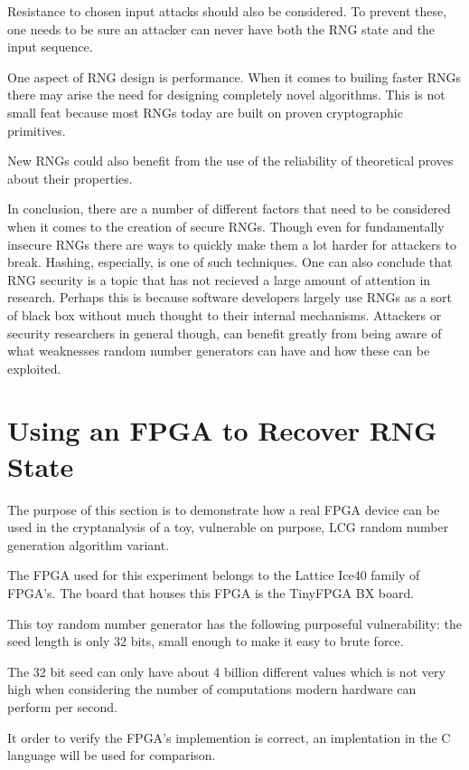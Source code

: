 \documentclass{article}
\begin{document}
    Resistance to chosen input attacks should also be considered. To prevent these,
    one needs to be sure an attacker can never have both the RNG state and the
    input sequence.

    One aspect of RNG design is performance. When it comes to builing faster RNGs
    there may arise the need for designing completely novel algorithms.
    This is not small feat because most RNGs today are built on proven cryptographic
    primitives.

    New RNGs could also benefit from the use of the reliability of theoretical proves
    about their properties.

    In conclusion, there are a number of different factors that need to be considered
    when it comes to the creation of secure RNGs. Though even for fundamentally insecure
    RNGs there are ways to quickly make them a lot harder for attackers to break.
    Hashing, especially, is one of such techniques.
    One can also conclude that RNG security is a topic that has not recieved a large
    amount of attention in research. Perhaps this is because software developers
    largely use RNGs as a sort of black box without much thought to their internal
    mechanisms.
    Attackers or security researchers in general though, can benefit greatly from
    being aware of what weaknesses random number generators can have and
    how these can be exploited.

    \section{Using an FPGA to Recover RNG State}

    The purpose of this section is to demonstrate how a real FPGA device
    can be used in the cryptanalysis of a toy, vulnerable on purpose,
    LCG random number generation algorithm variant.

    The FPGA used for this experiment belongs to the Lattice Ice40 family of FPGA's.
    The board that houses this FPGA is the TinyFPGA BX board.

    This toy random number generator has the following purposeful vulnerability:
    the seed length is only 32 bits, small enough to make it easy to brute force.

    The 32 bit seed can only have about 4 billion different values which
    is not very high when considering the number of computations modern hardware can perform
    per second.

    It order to verify the FPGA's implemention is correct, an implentation in the C
    language will be used for comparison.
\end{document}
